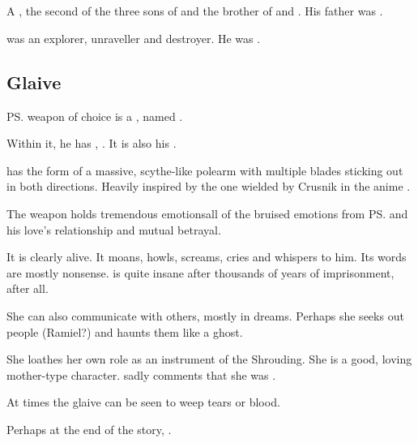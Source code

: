 \section{\QuessanthIshnaruchaefir}
\index{\Ishnaruchaefir}
\index{\QuessanthIshnaruchaefir}
A \shaeeroth, the second of the three sons of \Tiamat and the brother of \Nexagglachel{} and \Secherdamon.
His father was \Iurzmacul. 

\Ishnaruchaefir{} was an explorer, unraveller and destroyer. 
He was . 









\subsection{Glaive} 
\ps{\Ishnaruchaefir} weapon of choice is a , named \Triestessakhin.

Within it, he has , \Triestessakhin{}. 
It is also his . 

\Triestessakhin{} has the form of a massive, scythe-like polearm with multiple blades sticking out in both directions. 
Heavily inspired by the one wielded by Crusnik in the anime \cite{Anime:TrinityBlood}.

The weapon holds tremendous emotions\dash all of the bruised emotions from \ps{\Ishnaruchaefir} and his love's relationship and mutual betrayal. 

It is clearly alive. 
It moans, howls, screams, cries and whispers to him. 
Its words are mostly nonsense. 
\Triestessakhin{} is quite insane after thousands of years of imprisonment, after all. 

She can also communicate with others, mostly in dreams. 
Perhaps she seeks out people (Ramiel?) and haunts them like a ghost. 

She loathes her own role as an instrument of the Shrouding. 
She is a good, loving mother-type character. 
\Ishna{} sadly comments that she was .

At times the glaive can be seen to weep tears or blood.

Perhaps at the end of the story, . 

